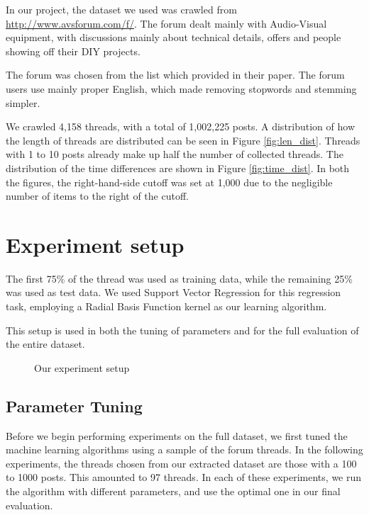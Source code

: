 In our project, the dataset we used was crawled from 
\url{http://www.avsforum.com/f/}. The forum dealt mainly with Audio-Visual 
equipment, with discussions mainly about technical details, offers and people 
showing off their DIY projects.

The forum was chosen from the list which  provided in their 
paper. The forum users use mainly proper English, which made removing stopwords 
and stemming simpler.

We crawled 4,158 threads, with a total of 1,002,225 posts. A distribution of how 
the length of threads are distributed can be seen in Figure \ref{fig:len_dist}.  
Threads with 1 to 10 posts already make up half the number of collected threads.
The distribution of the time differences are shown in Figure 
\ref{fig:time_dist}. In both the figures, the right-hand-side cutoff was set at 
1,000 due to the negligible number of items to the right of the cutoff.



\section{Experiment setup}
The first 75\% of the thread was used as training data, while the remaining 25\% 
was used as test data. We used Support Vector Regression for this regression 
task, employing a Radial Basis Function kernel as our learning algorithm. 

This setup is used in both the tuning of parameters and for the full evaluation 
of the entire dataset.
\begin{figure}
	
	\caption{Our experiment setup}
	\label{fig:exp_setup}
\end{figure}

\subsection{Parameter Tuning}
Before we begin performing experiments on the full dataset, we first tuned the 
machine learning algorithms using a sample of the forum threads. In the 
following experiments, the threads chosen from our extracted dataset are those 
with a 100 to 1000 posts. This amounted to 97 threads. In each of these 
experiments, we run the algorithm with different parameters, and use the optimal 
one in our final evaluation. 

